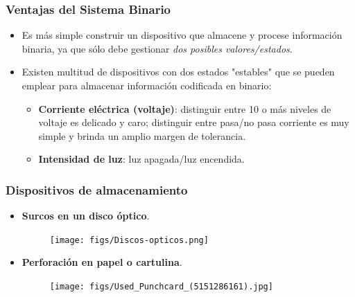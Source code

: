 \documentclass[aspectratio=169]{beamer}
\begin{document}
\begin{frame}[fragile]\frametitle{Ventajas del Sistema Binario}
\begin{itemize}
	\item Es más simple construir un dispositivo que almacene y procese información binaria, ya que sólo debe gestionar \emph{dos posibles valores/estados}.

\item Existen multitud de dispositivos con dos estados "estables" que se pueden emplear para almacenar información codificada en binario:
\begin{itemize}
	\item \textbf{Corriente eléctrica (voltaje)}: distinguir entre 10 o más niveles de voltaje es delicado y caro; distinguir entre pasa/no pasa corriente es muy simple y brinda un amplio margen de tolerancia.
	\item \textbf{Intensidad de luz}: luz apagada/luz encendida.
\end{itemize}
\end{itemize}
\end{frame}
\begin{frame}[fragile]\frametitle{Dispositivos de almacenamiento}
\begin{itemize}
	\item \textbf{Surcos en un disco óptico}.
	\begin{figure}
	\begin{center}
	\texttt{[image: figs/Discos-opticos.png]}\hspace{1cm}	
	\end{center}
	\end{figure}
	\item \textbf{Perforación en papel o cartulina}.
	\begin{figure}
	\begin{center}
	\texttt{[image: figs/Used\_Punchcard\_(5151286161).jpg]}\hspace{1cm}	
	\end{center}
	\end{figure}
\end{itemize}
\end{frame}
\end{document}

